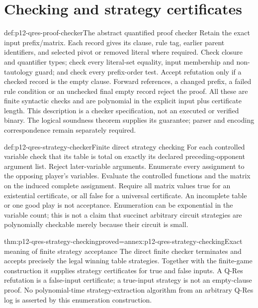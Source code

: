 \section{Checking and strategy certificates}

\begin{hbmethod}{def:p12-qres-proof-checker}{The abstract quantified proof checker}
Retain the exact input prefix/matrix.  Each record gives its clause, rule tag,
earlier parent identifiers, and selected pivot or removed literal where
required.  Check closure and quantifier types; check every literal-set equality,
input membership and non-tautology guard; and check every prefix-order test.
Accept refutation only if a checked record is the empty clause.  Forward
references, a changed prefix, a failed rule condition or an unchecked final
empty record reject the proof.  All these are finite syntactic checks and
are polynomial in the explicit input plus certificate length.  This
description is a checker specification, not an executed or verified binary.
The logical soundness theorem supplies its guarantee; parser and encoding
correspondence remain separately required.
\end{hbmethod}

\begin{hbmethod}{def:p12-qres-strategy-checker}{Finite direct strategy checking}
For each controlled variable check that its table is total on exactly its
declared preceding-opponent argument list.  Reject later-variable arguments.
Enumerate every assignment to the opposing player's variables.  Evaluate the
controlled functions and the matrix on the induced complete assignment.
Require all matrix values true for an existential certificate, or all false
for a universal certificate.  An incomplete table or one good play is not
acceptance.  Enumeration can be exponential in the variable count; this is
not a claim that succinct arbitrary circuit strategies are polynomially
checkable merely because their circuit is small.
\end{hbmethod}

\begin{hbtheorem}{thm:p12-qres-strategy-checking}{proved=annex:p12-qres-strategy-checking}{Exact meaning of finite strategy acceptance}
The direct finite checker terminates and accepts precisely the legal winning
table strategies.  Together with the finite-game construction it supplies
strategy certificates for true and false inputs.  A Q-Res refutation is a
false-input certificate; a true-input strategy is not an empty-clause proof.
No polynomial-time strategy-extraction algorithm from an arbitrary Q-Res log
is asserted by this enumeration construction.
\end{hbtheorem}

